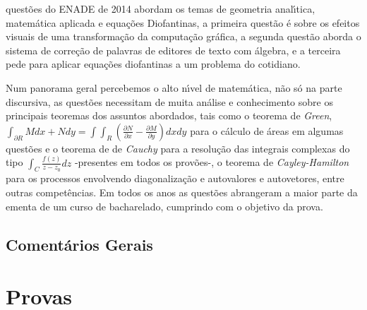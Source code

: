 \documentclass{report}
\begin{document}
quest\~oes do ENADE de 2014 abordam os temas de geometria anal\'\i tica, matem\'atica aplicada e equa\c c\~oes Diofantinas, a primeira quest\~ao \'e sobre os efeitos visuais de uma transforma\c c\~ao da computa\c c\~ao gr\'afica, a segunda quest\~ao aborda o sistema de corre\c c\~ao de palavras de editores de texto com \'algebra, e a terceira pede para aplicar equa\c c\~oes diofantinas a um problema do cotidiano.

Num panorama geral percebemos o alto n\'\i vel de matem\'atica, n\~ao s\'o na parte discursiva, as quest\~oes necessitam de muita an\'alise e conhecimento sobre os principais teoremas dos assuntos abordados, tais como o teorema de {\it Green}, $\displaystyle \int_{\partial R} M dx + N dy= \int\!\int_R \left( \frac{\partial N}{\partial x} - \frac{\partial M}{\partial y}\right) dx dy $ para o c\'alculo de \'areas em algumas quest\~oes e o teorema de de {\it Cauchy} para a resolu\c c\~ao das integrais complexas do tipo $\displaystyle \int_C \frac{f(z)}{z-z_0} dz$ -presentes em todos os prov\~oes-, o teorema de {\it Cayley-Hamilton} para os processos envolvendo diagonaliza\c c\~ao e autovalores e autovetores, entre outras compet\^encias. Em todos os anos as quest\~oes abrangeram a maior parte da ementa de um curso de bacharelado, cumprindo com o objetivo da prova.

\chapter{Coment\'arios Gerais}

\part{Provas}
 



















\end{document}
